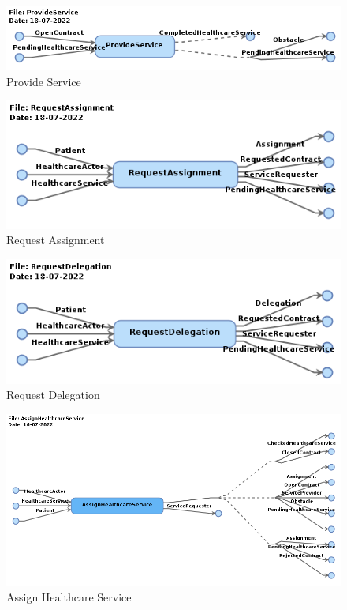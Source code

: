 \begin{figure}
    \centering
    \includegraphics[width=\textwidth]{overleaf/images/testing/ProvideService.png}
    \caption{Provide Service}
    \label{appendix:fig:ProvideService}
\end{figure}

\begin{figure}
    \centering
    \includegraphics[width=\textwidth]{overleaf/images/testing/RequestAssignment.png}
    \caption{Request Assignment}
    \label{appendix:fig:RequestAssignment}
\end{figure}

\begin{figure}
    \centering
    \includegraphics[width=\textwidth]{overleaf/images/testing/RequestDelegation.png}
    \caption{Request Delegation}
    \label{appendix:fig:RequestDelegation}
\end{figure}

\begin{figure}
    \centering
    \includegraphics[width=\textwidth]{overleaf/images/testing/AssignHealthcareService.png}
    \caption{Assign Healthcare Service}
    \label{appendix:fig:AssignHealthcareService}
\end{figure}

